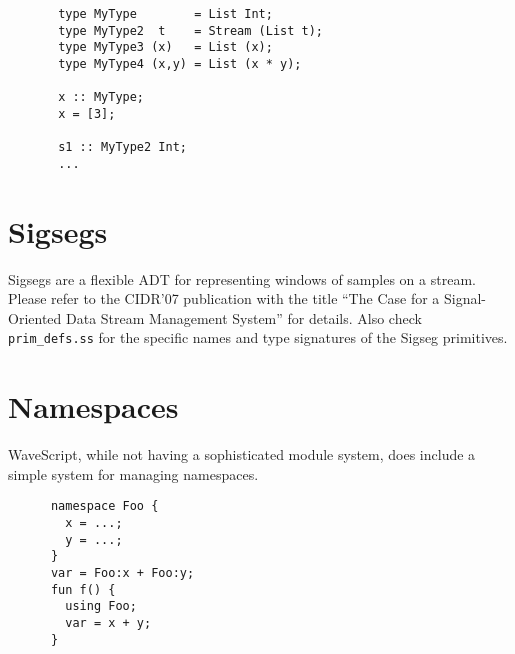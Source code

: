 \documentclass[twocolumn]{report}
\begin{document}
\begin{center}
\begin{verbatim}
       type MyType        = List Int;
       type MyType2  t    = Stream (List t);
       type MyType3 (x)   = List (x);
       type MyType4 (x,y) = List (x * y);

       x :: MyType;
       x = [3];

       s1 :: MyType2 Int;
       ...
\end{verbatim}
\end{center}


\section{Sigsegs}

Sigsegs are a flexible ADT for representing windows of samples on a stream.
Please refer to the CIDR'07 publication with the title
``The Case for a Signal-Oriented Data Stream Management System'' for
details.  Also check {\tt prim\_defs.ss} for the specific names and
type signatures of the Sigseg primitives.






  






\section{Namespaces}

WaveScript, while not having a sophisticated module system, does
include a simple system for managing namespaces.

\begin{center}
\begin{verbatim}
      namespace Foo {
        x = ...;
        y = ...;
      }
      var = Foo:x + Foo:y;
      fun f() {
        using Foo;
        var = x + y;
      }
\end{verbatim}
\end{center}
\end{document}
